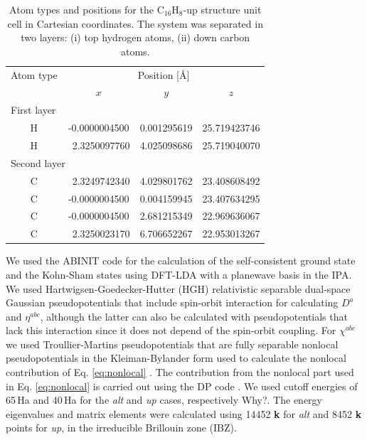 \documentclass[pss]{wiley2sp} %
\begin{document}
\begin{table}[t]
  \begin{tabular}{cccc}
  \hline
  Atom type &  \multicolumn{3}{c}{Position [\AA]} \\
  \cline{2-4}
  & $x$ & $y$ & $z$ \\
  \hline
  \multicolumn{2}{l}{First layer}\\
H &  -0.0000004500 & 0.001295619 & 25.719423746 \\
H & \ 2.3250097760 & 4.025098686 & 25.719040070 \\
  \multicolumn{2}{l}{Second layer}\\
C & \ 2.3249742340 & 4.029801762 & 23.408608492 \\
C &  -0.0000004500 & 0.004159945 & 23.407634295 \\
C &  -0.0000004500 & 2.681215349 & 22.969636067 \\
C & \ 2.3250023170 & 6.706652267 & 22.953013267 \\
  \hline
  \end{tabular}
  \caption[]{%
  Atom types and positions for the C$_{16}$H$_{8}$-up structure unit cell in Cartesian coordinates. The system was separated in two layers: (i) top hydrogen atoms, (ii) down carbon atoms.}
  \label{tab:upstrc}
\end{table}

We used the ABINIT code \cite{torrentCMS08} for the calculation of the self-consistent ground state and the Kohn-Sham states using DFT-LDA with a planewave basis in the IPA. We used Hartwigsen-Goedecker-Hutter (HGH) relativistic separable dual-space Gaussian pseudopotentials \cite{hartwigsenPRB98} that include spin-orbit interaction for calculating $D^{a}$ and {$\eta^{abc}$}, although the latter can also be calculated with pseudopotentials that lack this interaction since it does not depend of the spin-orbit coupling. For $\chi^{abc}$ we used Troullier-Martins pseudopotentials \cite{troullierPRB91} that are fully separable nonlocal pseudopotentials in the Kleiman-Bylander form used to calculate the nonlocal contribution of Eq. \eqref{eq:nonlocal} \cite{kleinmanPRL82}. The contribution from the nonlocal part used in Eq. \eqref{eq:nonlocal} is carried out using the DP code \cite{olevanoDP}. We used cutoff energies of 65\,Ha and 40\,Ha for the \emph{alt} and \emph{up} cases, respectively {\Large Why?}. The energy eigenvalues and matrix elements were calculated using 14452 \textbf{k} for \emph{alt} and 8452 \textbf{k} points for \emph{up}, in the irreducible Brillouin zone (IBZ).
\end{document}
